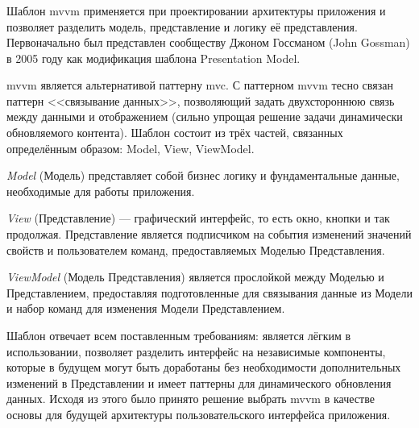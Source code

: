 \subsubsection {}
\label{sec:analysis:research:mobArch:mvvm}

Шаблон \gls{mvvm} применяется при проектировании архитектуры приложения и позволяет разделить модель, представление и логику её представления. Первоначально был представлен сообществу Джоном Госсманом (John Gossman) в 2005 году как модификация шаблона Presentation Model. \cite{wiki:mvvm}

\gls{mvvm} является альтернативой паттерну \gls{mvc}. С паттерном \gls{mvvm} тесно связан паттерн <<связывание данных>>, позволяющий задать двухстороннюю связь между данными и отображением (сильно упрощая решение задачи динамически обновляемого контента). Шаблон состоит из трёх частей, связанных определённым образом: Model, View, ViewModel.

\emph{Model} (Модель) представляет собой бизнес логику и фундаментальные данные, необходимые для работы приложения.

\emph{View} (Представление) --- графический интерфейс, то есть окно, кнопки и так продолжая. Представление является подписчиком на события изменений значений свойств и пользователем команд, предоставляемых Моделью Представления.

\emph{ViewModel} (Модель Представления) является прослойкой между Моделью и Представлением, предоставляя подготовленные для связывания данные из Модели и набор команд для изменения Модели Представлением.

Шаблон отвечает всем поставленным требованиям: является лёгким в использовании, позволяет разделить интерфейс на независимые компоненты, которые в будущем могут быть доработаны без необходимости дополнительных изменений в Представлении и имеет паттерны для динамического обновления данных. Исходя из этого было принято решение выбрать \gls{mvvm} в качестве основы для будущей архитектуры пользовательского интерфейса приложения.